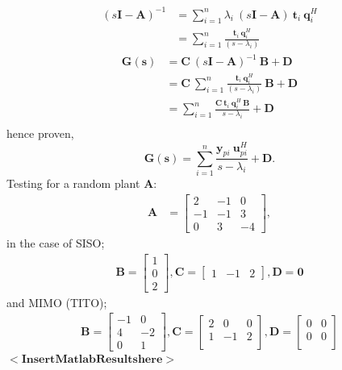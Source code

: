 \documentclass{scrreprt}
\begin{document}
\begin{align*}
(s\bm{I} - \bm{A})^{-1} &= \sum_{i=1}^n \lambda_i\: (s\bm{I} - \bm{A})\: \bm{t}_i\: \bm{q}_i^H \\
	&= \sum_{i=1}^n \frac{\bm{t}_i\: \bm{q}_i^H}{(s - \lambda_i)}
\end{align*}
\begin{align*}
\bm{G(s)} &=  \bm{C} \: (s\bm{I} - \bm{A})^{-1} \: \bm{B} + \bm{D} \\
	&= \bm{C}\: \sum_{i=1}^n \frac{\bm{t}_i\: \bm{q}_i^H}{(s - \lambda_i)}\: \bm{B} + \bm{D} \\
	&= \sum_{i=1}^n \frac{\bm{C}\: \bm{t}_i\: \bm{q}_i^H\: \bm{B}}{s - \lambda_i} + \bm{D} \\
\end{align*}
hence proven,
\begin{equation}
\bm{G(s)} = \sum_{i=1}^n \frac{\bm{y}_{pi}\: \bm{u}_{pi}^H}{s - \lambda_i} + \bm{D} \text{.}
\end{equation}
Testing for a random plant $\bm{A}$: 
\begin{align*}
\bm{A} &=
\begin{bmatrix}
2 & -1 & 0 \\
-1 & -1 & 3 \\
0 & 3 & -4 
\end{bmatrix},
\end{align*}
in the case of SISO;
\begin{align*}
\bm{B} = 
\begin{bmatrix}
1 \\
0 \\
2 
\end{bmatrix},
\bm{C} = 
 \begin{bmatrix}
1 & -1 & 2 
\end{bmatrix},
\bm{D} = \bm{0}
\end{align*}
and MIMO (TITO);
\begin{align*}
\bm{B} = 
\begin{bmatrix}
-1 & 0 \\
4 & -2 \\
0 & 1 
\end{bmatrix},
\bm{C} = 
 \begin{bmatrix}
2 & 0 & 0 \\
1 & -1 & 2 \\
\end{bmatrix},
\bm{D} = 
 \begin{bmatrix}
0 & 0 \\
0 & 0 \\
\end{bmatrix}
\end{align*}
$\bm{<Insert Matlab Results here>}$ \\\\
\end{document}
